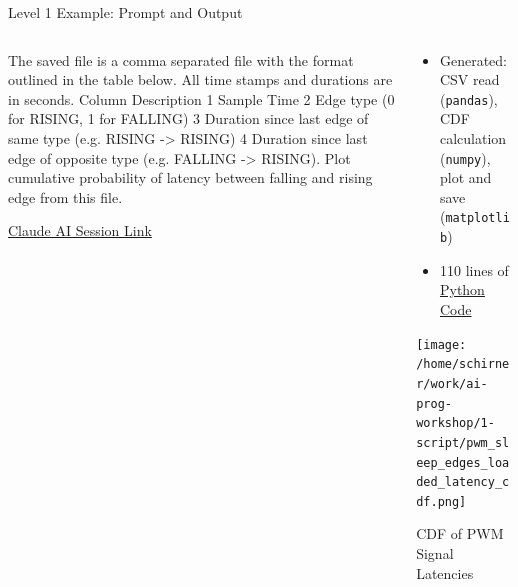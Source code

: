 \documentclass[xcolor=dvipsnames, aspectratio=169]{beamer}
\begin{document}
\begin{frame}[fragile]{Level 1 Example: Prompt and Output}
  \begin{columns}
    \begin{column}{0.6\textwidth}
    \begin{promptbox}
      The saved file is a comma separated file with the format outlined in the table below. All time stamps and durations are in seconds. Column Description 1 Sample Time 2 Edge type (0 for RISING, 1 for FALLING) 3 Duration since last edge of same type (e.g. RISING -> RISING) 4 Duration since last edge of opposite type (e.g. FALLING -> RISING). Plot cumulative probability of latency between falling and rising edge from this file.      
    \end{promptbox}
      \small\href{https://claude.ai/share/7e11fde4-bb5e-476e-b8f3-9dad820724f5}{Claude AI Session Link}
    \end{column}
    
    \begin{column}{0.4\textwidth}
      \begin{itemize}
        \item Generated: CSV read (\texttt{pandas}), CDF calculation (\texttt{numpy}), plot and save (\texttt{matplotlib})
        \item 110 lines of \href{https://github.com/neu-ece-esl/ai-prog-workshop/blob/main/1-script/analyze_latency.py}{Python Code}
      \end{itemize}
      \texttt{[image: /home/schirner/work/ai-prog-workshop/1-script/pwm\_sleep\_edges\_loaded\_latency\_cdf.png]}
      \small\centerline{CDF of PWM Signal Latencies}
      
    \end{column}
  \end{columns}
\end{frame}
\end{document}
